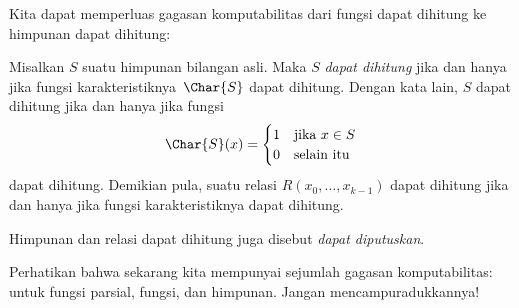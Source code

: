\documentclass[../../../include/open-logic-section]{subfiles}
\begin{document}

Kita dapat memperluas gagasan komputabilitas dari fungsi dapat dihitung ke
himpunan dapat dihitung:

\begin{defn}
  Misalkan $S$ suatu himpunan bilangan asli. Maka $S$ \emph{dapat dihitung}
  jika dan hanya jika fungsi karakteristiknya~$\Char{S}$ dapat dihitung. Dengan
  kata lain, $S$ dapat dihitung jika dan hanya jika fungsi
\[
\Char{S}(x) =
\begin{cases}
1 & \text{jika $x \in S$} \\
0 & \text{selain itu}
\end{cases}
\]
dapat dihitung. Demikian pula, suatu relasi $R(x_0, \dots, x_{k-1})$ dapat
dihitung jika dan hanya jika fungsi karakteristiknya dapat dihitung.

Himpunan dan relasi dapat dihitung juga disebut \emph{dapat diputuskan}.
\end{defn}

\begin{explain}
Perhatikan bahwa sekarang kita mempunyai sejumlah gagasan komputabilitas:
untuk fungsi parsial, fungsi, dan himpunan. Jangan mencampuradukkannya!{}
\end{explain}
\end{document}
